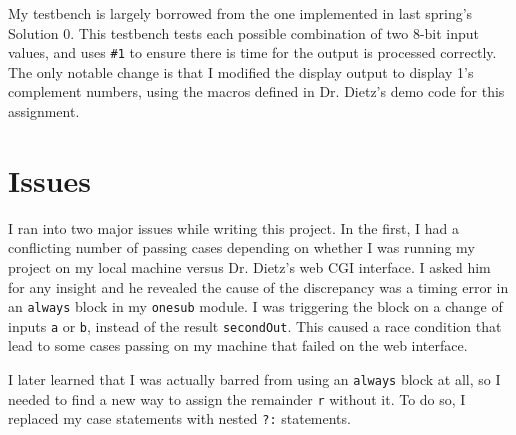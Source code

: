 \documentclass{sig-alternate-05-2015}
\begin{document}
My testbench is largely borrowed from the one implemented in last spring's Solution 0. This testbench tests each possible combination of two 8-bit input values, and uses \texttt{\#1} to ensure there is time for the output is processed correctly. The only notable change is that I modified the display output to display 1's complement numbers, using the macros defined in Dr. Dietz's demo code for this assignment.

\vfill\pagebreak

\section{Issues}

I ran into two major issues while writing this project. In the first, I had a conflicting number of passing cases depending on whether I was running my project on my local machine versus Dr. Dietz's web CGI interface. I asked him for any insight and he revealed the cause of the discrepancy was a timing error in an \texttt{always} block in my \texttt{onesub} module. I was triggering the block on a change of inputs \texttt{a} or \texttt{b}, instead of the result \texttt{secondOut}. This caused a race condition that lead to some cases passing on my machine that failed on the web interface.

I later learned that I was actually barred from using an \texttt{always} block at all, so I needed to find a new way to assign the remainder \texttt{r} without it. To do so, I replaced my case statements with nested \texttt{?:} statements.
\end{document}
